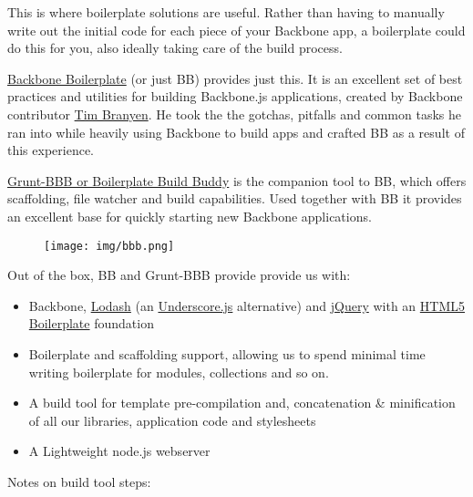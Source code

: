 \documentclass[9pt]{book}
\begin{document}
This is where boilerplate solutions are useful. Rather than having to
manually write out the initial code for each piece of your Backbone app,
a boilerplate could do this for you, also ideally taking care of the
build process.

\href{https://github.com/tbranyen/backbone-boilerplate/}{Backbone
Boilerplate} (or just BB) provides just this. It is an excellent set of
best practices and utilities for building Backbone.js applications,
created by Backbone contributor \href{https://github.com/tbranyen}{Tim
Branyen}. He took the the gotchas, pitfalls and common tasks he ran into
while heavily using Backbone to build apps and crafted BB as a result of
this experience.

\href{https://github.com/backbone-boilerplate/grunt-bbb}{Grunt-BBB or
Boilerplate Build Buddy} is the companion tool to BB, which offers
scaffolding, file watcher and build capabilities. Used together with BB
it provides an excellent base for quickly starting new Backbone
applications.

\begin{figure}[htbp]
\centering
\texttt{[image: img/bbb.png]}
\end{figure}

Out of the box, BB and Grunt-BBB provide provide us with:

\begin{itemize}
\itemsep1pt\parskip0pt
\item
  Backbone, \href{https://github.com/bestiejs/lodash}{Lodash} (an
  \href{http://underscorejs.org/}{Underscore.js} alternative) and
  \href{http://jquery.com}{jQuery} with an
  \href{http://html5boilerplate.com}{HTML5 Boilerplate} foundation
\item
  Boilerplate and scaffolding support, allowing us to spend minimal time
  writing boilerplate for modules, collections and so on.
\item
  A build tool for template pre-compilation and, concatenation \&
  minification of all our libraries, application code and stylesheets
\item
  A Lightweight node.js webserver
\end{itemize}

Notes on build tool steps:
\end{document}
